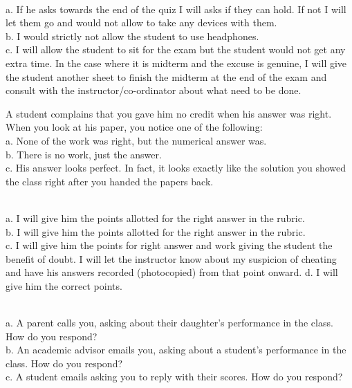\begin{solution}\ \\
    a. If he asks towards the end of the quiz I will asks if they can hold. If not I will let them go and would not allow to take any devices with them.\\
    b. I would strictly not allow the student to use headphones.\\
    c. I will allow the student to sit for the exam but the student would not get any extra time. In the case where it is midterm and the excuse is genuine, I will give the student another sheet to finish the midterm at the end of the exam and consult with the instructor/co-ordinator about what need to be done.
\end{solution}

\begin{prob}
    A student complains that you gave him no credit when his answer was right. When you look at his
paper, you notice one of the following:\\
a. None of the work was right, but the numerical answer was.\\
b. There is no work, just the answer.\\
c. His answer looks perfect. In fact, it looks exactly like the solution you showed the class right after
you handed the papers back.
\end{prob}

\begin{solution}\ \\
    a. I will give him the points allotted for the right answer in the rubric.\\
    b. I will give him the points allotted for the right answer in the rubric.\\
    c. I will give him the points for right answer and work giving the student the benefit of doubt. I will let the instructor know about my suspicion of cheating and have his answers recorded (photocopied) from that point onward.
    d. I will give him the correct points.
\end{solution}

\begin{prob}\ \\
    a. A parent calls you, asking about their daughter’s performance in the class. How do you respond?\\
    b.  An academic advisor emails you, asking about a student’s performance in the class. How do you
respond?\\
    c. A student emails asking you to reply with their scores. How do you respond?
\end{prob}

